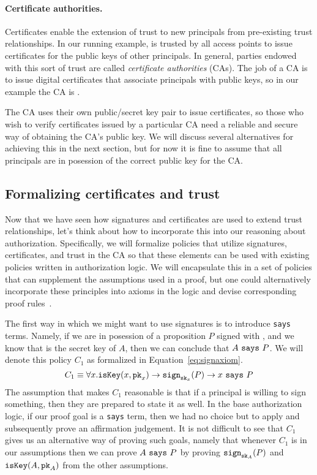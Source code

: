 \documentclass[11pt,twoside]{scrartcl}
\begin{document}
\paragraph{Certificate authorities.}
Certificates enable the extension of trust to new principals from pre-existing trust relationships. In our running example, \eduroam is trusted by all access points to issue certificates for the public keys of other principals. In general, parties endowed with this sort of trust are called \emph{certificate authorities} (CAs). The job of a CA is to issue digital certificates that associate principals with public keys, so in our example the CA is \eduroam.

The CA uses their own public/secret key pair to issue certificates, so those who wish to verify certificates issued by a particular CA need a reliable and secure way of obtaining the CA's public key. We will discuss several alternatives for achieving this in the next section, but for now it is fine to assume that all principals are in posession of the correct public key for the CA.

\subsection{Formalizing certificates and trust}

Now that we have seen how signatures and certificates are used to extend trust relationships, let's think about how to incorporate this into our reasoning about authorization. Specifically, we will formalize policies that utilize signatures, certificates, and trust in the CA so that these elements can be used with existing policies written in authorization logic. We will encapsulate this in a set of policies that can supplement the assumptions used in a proof, but one could alternatively incorporate these principles into axioms in the logic and devise corresponding proof rules~\cite{bauer:thesis}.

The first way in which we might want to use signatures is to introduce \verb'says' terms. Namely, if we are in posession of a proposition $P$ signed with , and we know that  is the secret key of $A$, then we can conclude that $A~\texttt{\upshape says}~P$. We will denote this policy $C_1$ as formalized in Equation~\ref{eq:signaxiom}.
\begin{equation}
\label{eq:signaxiom}
C_1 \equiv \forall x . \iskey{x}{\pk{x}} \limply \sign{\sk{x}}{\ausfml} \limply \says{x}{\ausfml}
\end{equation}
The assumption that makes $C_1$ reasonable is that if a principal is willing to sign something, then they are prepared to state it as well. In the base authorization logic, if our proof goal is a \verb'says' term, then we had no choice but to apply  and subsequently prove an affirmation judgement. It is not difficult to see that $C_1$ gives us an alternative way of proving such goals, namely that whenever $C_1$ is in our assumptions then we can prove $A~\texttt{\upshape says}~P$ by proving $\texttt{\upshape sign}_{\texttt{\upshape sk}_{A}}(P)$ and $\texttt{\upshape isKey}(A,\texttt{\upshape pk}_{A})$ from the other assumptions.
\end{document}
